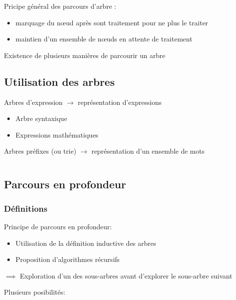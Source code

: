 Pricipe général des parcours d'arbre :

\begin{itemize}
\tightlist
\item
  marquage du nœud après sont traitement pour ne plus le traiter
\item
  maintien d'un ensemble de nœuds en attente de traitement
\end{itemize}

Existence de plusieurs manières de parcourir un arbre

\hypertarget{utilisation-des-arbres-1}{%
\subsection{Utilisation des arbres}\label{utilisation-des-arbres-1}}

Arbres d'expression \(\to\) représentation d'expressions

\begin{itemize}
\tightlist
\item
  Arbre syntaxique
\item
  Expressions mathématiques
\end{itemize}

Arbres préfixes (ou trie) \(\to\) représentation d'un ensemble de mots

\[ %
\]

\hypertarget{parcours-en-profondeur}{%
\subsection{Parcours en profondeur}\label{parcours-en-profondeur}}

\hypertarget{duxe9finitions-2}{%
\subsubsection{Définitions}\label{duxe9finitions-2}}

Principe de parcours en profondeur:

\begin{itemize}
\tightlist
\item
  Utilisation de la définition inductive des arbres
\item
  Proposition d'algorithmes récursifs
\end{itemize}

\(\implies\) Exploration d'un des sous-arbres avant d'explorer le
sous-arbre suivant

Plusieurs posibilités:

